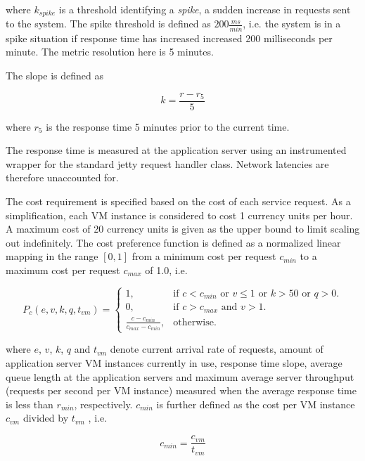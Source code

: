 \documentclass[english]{tktltiki2}
\theoremstyle{definition}
\theoremstyle{remark}
\begin{document}
where $k_{spike}$ is a threshold identifying a \textit{spike}, a sudden increase
in requests sent to the system. The spike threshold is defined as $200
\frac{ms}{min}$, i.e. the system is in a spike situation if response time has
increased increased 200 milliseconds per minute. The metric resolution here is 5
minutes.

The slope is defined as 

\begin{equation}
	k = \frac{r - r_{5}}{5}
  \label{eq:responseTimeSlope}
\end{equation}

where $r_{5}$ is the response time 5 minutes prior to the current time.

The response time is measured at the application server using an instrumented
wrapper for the standard jetty request handler class. Network latencies are
therefore unaccounted for.

The cost requirement is specified based on the cost of each service request. As
a simplification, each VM instance is considered to cost 1 currency units per
hour. A maximum cost of 20 currency units is given as the upper bound to limit
scaling out indefinitely. The cost preference function is defined as a
normalized linear mapping in the range $[0,1]$ from a minimum cost per
request $c_{min}$ to a maximum cost per request
$c_{max}$ of 1.0, i.e. 


\begin{equation}
P_{c}(e, v, k, q, t_{vm}) = \begin{cases}
    1, & \text{if $c < c_{min}$ or $v \leq 1$ or $k > 50$ or $q > 0$}.\\
    0, & \text{if $c > c_{max}$ and $v > 1$}.\\
    \frac{c - c_{min}}
    	 {c_{max} - c_{min}}, & \text{otherwise}.
  \end{cases}
  \label{eq:costPreference}
\end{equation}

where $e$, $v$, $k$, $q$ and $t_{vm}$ denote current arrival rate of requests,
amount of application server VM instances currently in use, response time slope,
average queue length at the application servers and maximum average
server throughput (requests per second per VM instance) measured when the average
response time is less than $r_{min}$, respectively. $c_{min}$ is further defined
as the cost per VM instance $c_{vm}$ divided by $t_{vm}$ , i.e.

\begin{equation}
	c_{min} = 
	\frac{c_{vm}}{t_{vm}} 
	\label{eq:costMin}
\end{equation}
\end{document}
